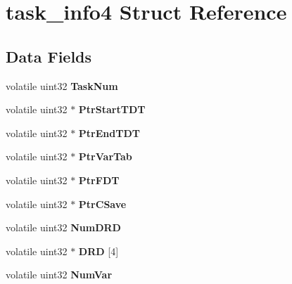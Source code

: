 \hypertarget{structtask__info4}{}\section{task\+\_\+info4 Struct Reference}
\label{structtask__info4}
\subsection*{Data Fields}
\begin{DoxyCompactItemize}
\item 
\mbox{\label{structtask__info4_a69ae14bcadee36b102bc5406c1828bc6}} 
volatile uint32 {\bfseries Task\+Num}
\item 
\mbox{\label{structtask__info4_aa3e6546b5ce0afc4e0375dd67af3aae8}} 
volatile uint32 $\ast$ {\bfseries Ptr\+Start\+T\+DT}
\item 
\mbox{\label{structtask__info4_aabe80edd9c27928f1491a82d1969606e}} 
volatile uint32 $\ast$ {\bfseries Ptr\+End\+T\+DT}
\item 
\mbox{\label{structtask__info4_a297e6dabedcf08bac53e0c283f8bfb7d}} 
volatile uint32 $\ast$ {\bfseries Ptr\+Var\+Tab}
\item 
\mbox{\label{structtask__info4_ae3db458326191b81f5ed2b857938aaa7}} 
volatile uint32 $\ast$ {\bfseries Ptr\+F\+DT}
\item 
\mbox{\label{structtask__info4_abae6af20ae8526884c7da76ff7c096e8}} 
volatile uint32 $\ast$ {\bfseries Ptr\+C\+Save}
\item 
\mbox{\label{structtask__info4_a0f7e2d04a7e0b5e3ac1d9d6f9cb74509}} 
volatile uint32 {\bfseries Num\+D\+RD}
\item 
\mbox{\label{structtask__info4_a01f6f6a75a4e313d9a5365e5ede7c443}} 
volatile uint32 $\ast$ {\bfseries D\+RD} \mbox{[}4\mbox{]}
\item 
\mbox{\label{structtask__info4_a2697da158862f580d3cbd8eca1122c6a}} 
volatile uint32 {\bfseries Num\+Var}
\item 

\end{DoxyCompactItemize}

